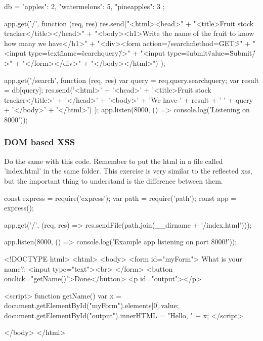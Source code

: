 \begin{Exercise}[label={websec-xss-types}]
\begin{js}
db = {
  "apples": 2,
  "watermelons": 5,
  "pineapples": 3
};

app.get('/', function (req, res) {
  res.send("<html><head>" +
  "<title>Fruit stock tracker</title></head>" +
  "<body><h1>Write the name of the fruit to know how many we have</h1>" +
  "<div><form action=\"/search\" method=\"GET\">" +
  "<input type=\"text\" name=\"searchquery\"/>" +
  "<input type=\"submit\" value=\"Submit\"/>" +
  "</form></div>" +
  "</body></html>")
});


app.get('/search', function (req, res) {
  var query = req.query.searchquery;
  var result = db[query];
  res.send('<html>' +
    '<head>' +
      '<title>Fruit stock tracker</title>' +
      '</head>' +
      '<body>' +
      'We have ' + result + ' ' + query +
      '</body>' +
    '</html>')
});
app.listen(8000, () => console.log('Listening on 8000'));
\end{js}


\subsubsection{DOM based XSS}
Do the same with this code. Remember to put the html in a file called 'index.html' in the same folder. This exercise is very similar to the reflected xss, but the important thing to understand is the difference between them.
\begin{js}
const express = require('express');
var path = require('path');
const app = express();

app.get('/', (req, res) => res.sendFile(path.join(__dirname + '/index.html')));

app.listen(8000, () => console.log('Example app listening on port 8000!'));
\end{js}
\begin{html}
<!DOCTYPE html>
<html>
  <body>
  <form id="myForm">
  What is your name?: <input type="text"><br>
  </form>
  <button onclick="getName()">Done</button>
  <p id="output"></p>
  
  <script>
    function getName(){
      var x = document.getElementById("myForm").elements[0].value;
      document.getElementById("output").innerHTML = "Hello, " + x;
    }
  </script>
  
  </body>
</html>
\end{html}
\end{Exercise}
